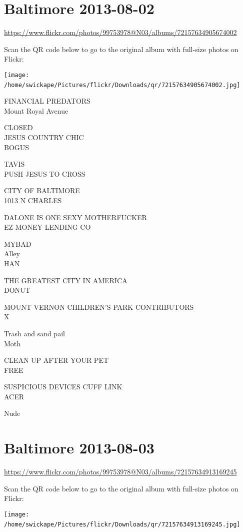 \documentclass[10pt,letterpaper]{article}
\title{}
\author{}
\date{}
\begin{document}
\section*{Baltimore 2013-08-02}

\url{https://www.flickr.com/photos/99753978@N03/albums/72157634905674002}

Scan the QR code below to go to the original album with full-size photos on Flickr:

\texttt{[image: /home/swickape/Pictures/flickr/Downloads/qr/72157634905674002.jpg]}
\

FINANCIAL PREDATORS\\
Mount Royal Avenue

CLOSED\\
JESUS COUNTRY CHIC\\
BOGUS

TAVIS\\
PUSH JESUS TO CROSS

CITY OF BALTIMORE\\
1013 N CHARLES

DALONE IS ONE SEXY MOTHERFUCKER\\
EZ MONEY LENDING CO

MYBAD\\
Alley\\
HAN

THE GREATEST CITY IN AMERICA\\
DONUT

MOUNT VERNON CHILDREN'S PARK CONTRIBUTORS\\
X

Trash and sand pail\\
Moth

CLEAN UP AFTER YOUR PET\\
FREE

SUSPICIOUS DEVICES CUFF LINK\\
ACER

Nude
\

\section*{Baltimore 2013-08-03}

\url{https://www.flickr.com/photos/99753978@N03/albums/72157634913169245}

Scan the QR code below to go to the original album with full-size photos on Flickr:

\texttt{[image: /home/swickape/Pictures/flickr/Downloads/qr/72157634913169245.jpg]}
\
\end{document}
